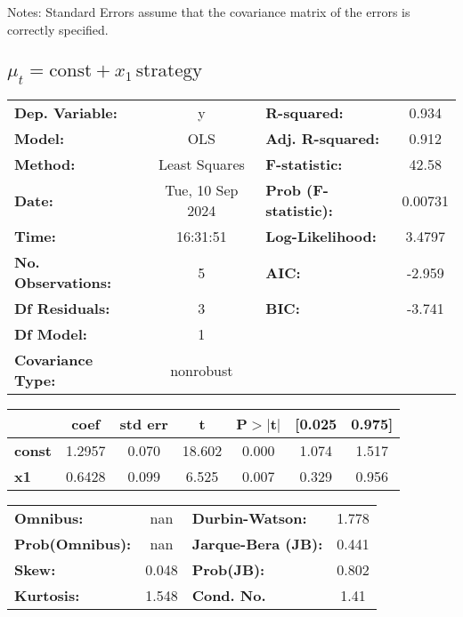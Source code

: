 \documentclass{article}
\begin{document}
Notes: \newline
[1] Standard Errors assume that the covariance matrix of the errors is correctly specified.



\subsection{$\mu_t = \text{const} + x_1\,\text{strategy}$}
\begin{center}
    \begin{tabular}{lclc}
        \toprule
        \textbf{Dep. Variable:}    & y                & \textbf{  R-squared:         } & 0.934   \\
        \textbf{Model:}            & OLS              & \textbf{  Adj. R-squared:    } & 0.912   \\
        \textbf{Method:}           & Least Squares    & \textbf{  F-statistic:       } & 42.58   \\
        \textbf{Date:}             & Tue, 10 Sep 2024 & \textbf{  Prob (F-statistic):} & 0.00731 \\
        \textbf{Time:}             & 16:31:51         & \textbf{  Log-Likelihood:    } & 3.4797  \\
        \textbf{No. Observations:} & 5                & \textbf{  AIC:               } & -2.959  \\
        \textbf{Df Residuals:}     & 3                & \textbf{  BIC:               } & -3.741  \\
        \textbf{Df Model:}         & 1                & \textbf{                     } &         \\
        \textbf{Covariance Type:}  & nonrobust        & \textbf{                     } &         \\
        \bottomrule
    \end{tabular}
    \begin{tabular}{lcccccc}
                       & \textbf{coef} & \textbf{std err} & \textbf{t} & \textbf{P$> |$t$|$} & \textbf{[0.025} & \textbf{0.975]} \\
        \midrule
        \textbf{const} & 1.2957        & 0.070            & 18.602     & 0.000               & 1.074           & 1.517           \\
        \textbf{x1}    & 0.6428        & 0.099            & 6.525      & 0.007               & 0.329           & 0.956           \\
        \bottomrule
    \end{tabular}
    \begin{tabular}{lclc}
        \textbf{Omnibus:}       & nan   & \textbf{  Durbin-Watson:     } & 1.778 \\
        \textbf{Prob(Omnibus):} & nan   & \textbf{  Jarque-Bera (JB):  } & 0.441 \\
        \textbf{Skew:}          & 0.048 & \textbf{  Prob(JB):          } & 0.802 \\
        \textbf{Kurtosis:}      & 1.548 & \textbf{  Cond. No.          } & 1.41  \\
        \bottomrule
    \end{tabular}
\end{center}
\end{document}
